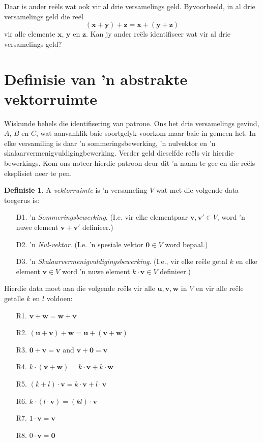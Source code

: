 \documentclass[a4paper,11pt]{book}
\theoremstyle{definition}
\newtheorem{definition}[theorem]{Definisie}
\newcommand{\be}{\begin{equation}}
\newcommand{\ee}{\end{equation}}
\newcommand{\ve}[1]{\mathbf{#1}}
\begin{document}
Daar is ander re{\"e}ls wat ook vir al drie versamelings geld.
Byvoorbeeld, in al drie versamelings geld die re{\"e}l
\be
(\ve{x} + \ve{y}) + \ve{z} = \ve{x} + (\ve{y} + \ve{z})
\ee
vir alle elemente $\ve{x}$, $\ve{y}$ en $\ve{z}$. Kan jy ander re{\"e}ls
identifiseer wat vir al drie versamelings geld?

\section{Definisie van 'n abstrakte vektorruimte}
Wiskunde behels die identifisering van patrone. Ons het drie versamelings
gevind, $A$, $B$ en $C$, wat aanvanklik baie soortgelyk voorkom maar baie
in gemeen het. In elke versamiling is daar 'n sommeringsbewerking, 'n
nulvektor en 'n skalaarvermenigvuldigingbewerking. Verder geld dieselfde
re{\"e}ls vir hierdie bewerkings. Kom ons noteer hierdie patroon deur dit
'n naam te gee en die re{\"e}ls eksplisiet neer te pen.

\begin{definition} A \emph{vektorruimte} is 'n versameling $V$ wat met die
	volgende data toegerus is: \label{defnvec}
	\begin{itemize}
		\item[D1.] 'n \emph{Sommeringsbewerking}.  (I.e. vir elke
			elementpaar $\ve{v}, \ve{v}' \in V$, word 'n nuwe element
			$\ve{v} + \ve{v}'$ definieer.)
		\item[D2.] 'n \emph{Nul-vektor}. (I.e. 'n spesiale vektor $\ve{0}
			\in V$ word bepaal.)
		\item[D3.] 'n \emph{ Skalaarvermenigvuldigingsbewerking}. (I.e.,
			vir elke re{\"e}le getal $k$ en elke element $\ve{v} \in V$
			word 'n nuwe element $k \cdot \ve{v} \in V$ definieer.)
	\end{itemize}

	Hierdie data moet aan die volgende re{\"e}ls vir alle $\ve{u}, \ve{v},
	\ve{w}$ in $V$ en vir alle re{\"e}le getalle $k$ en $l$ voldoen:
	\begin{enumerate}
		\item[R1.] $\ve{v} + \ve{w} = \ve{w} + \ve{v}$  \\
		\item[R2.] $(\ve{u} + \ve{v}) + \ve{w} = \ve{u} + (\ve{v} +
			\ve{w})$ \\
		\item[R3.] $\ve{0} + \ve{v} = \ve{v}$ and $\ve{v} + \ve{0} =
			\ve{v}$\\
		\item[R4.] $k \cdot (\ve{v} + \ve{w}) = k \cdot \ve{v} + k \cdot
			\ve{w}$
		\item[R5.] $(k + l) \cdot \ve{v} = k \cdot \ve{v} + l \cdot
			{\ve{v}}$
		\item[R6.] $k \cdot (l \cdot \ve{v}) = (kl) \cdot \ve{v}$
		\item[R7.] $1 \cdot \ve{v} = \ve{v}$
		\item[R8.] $0 \cdot \ve{v} = \ve{0}$
	\end{enumerate}
\end{definition}
\end{document}
